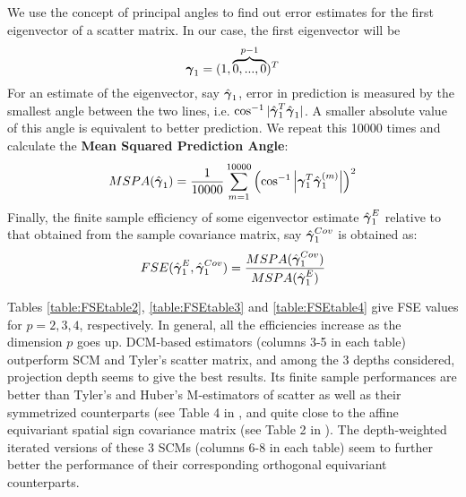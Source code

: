 \documentclass[fleqn,11pt]{article}
\begin{document}
We use the concept of principal angles \citep{miao92} to find out error estimates for the first eigenvector of a scatter matrix. In our case, the first eigenvector will be
%
$$ {\boldsymbol{\gamma}}_1 = (1,\overbrace{0,...,0}^{p-1})^T $$
%
For an estimate of the eigenvector, say $\hat{{\boldsymbol{\gamma}}}_1$, error in prediction is measured by the smallest angle between the two lines, i.e. $ \cos^{-1} | \hat{{\boldsymbol{\gamma}}}_1^T \hat{{\boldsymbol{\gamma}}}_1 | $. A smaller absolute value of this angle is equivalent to better prediction. We repeat this 10000 times and calculate the \textbf{Mean Squared Prediction Angle}:
%
$$ MSPA(\hat {{\boldsymbol{\gamma}}}_1) = \frac{1}{10000} \sum_{m=1}^{10000} \left( \cos^{-1} \left|{\boldsymbol{\gamma}}_1^T \hat{{\boldsymbol{\gamma}}}^{(m)}_1 \right| \right)^2 $$
%
Finally, the finite sample efficiency of some eigenvector estimate $\hat{{\boldsymbol{\gamma}}}^E_1$ relative to that obtained from the sample covariance matrix, say $\hat{{\boldsymbol{\gamma}}}^{Cov}_1$ is obtained as:
$$ FSE(\hat{{\boldsymbol{\gamma}}}^E_1, \hat{{\boldsymbol{\gamma}}}^{Cov}_1) = \frac{MSPA(\hat{{\boldsymbol{\gamma}}}^{Cov}_1)}{MSPA(\hat{{\boldsymbol{\gamma}}}^E_1)} $$

Tables \ref{table:FSEtable2}, \ref{table:FSEtable3} and \ref{table:FSEtable4} give FSE values for $p=2,3,4$, respectively. In general, all the efficiencies increase as the dimension $p$ goes up. DCM-based estimators (columns 3-5 in each table) outperform SCM and Tyler's scatter matrix, and among the 3 depths considered, projection depth seems to give the best results. Its finite sample performances are better than Tyler's and Huber's M-estimators of scatter as well as their symmetrized counterparts (see Table 4 in \cite{sirkia07}, and quite close to the affine equivariant spatial sign covariance matrix (see Table 2 in \cite{ollilia03}). The depth-weighted iterated versions of these 3 SCMs (columns 6-8 in each table) seem to further better the performance of their corresponding orthogonal equivariant counterparts.
\end{document}
